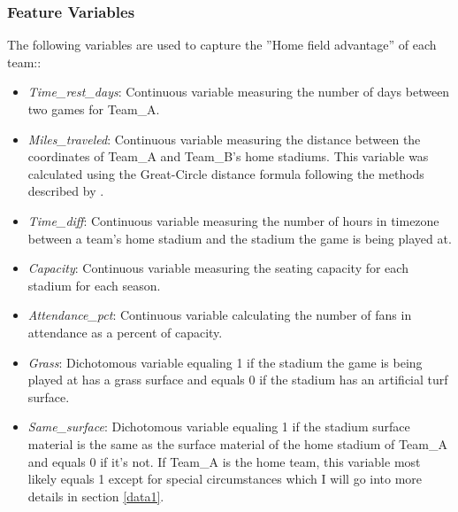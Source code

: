 \documentclass[12pt, letterpaper, twoside]{article}
\begin{document}
\subsubsection{Feature Variables}
The following variables are used to capture the ''Home field advantage'' of each team::
\begin{itemize}[noitemsep, leftmargin=*]
	
	\item \textit{Time\_rest\_days}: Continuous variable measuring the number of days between two games for Team\_A.
	
	\item \textit{Miles\_traveled}: Continuous variable measuring the distance between the coordinates of Team\_A and Team\_B's home stadiums. This variable was calculated using the Great-Circle distance formula following the methods described by \cite{distance}.
	
	\item \textit{Time\_diff}: Continuous variable measuring the number of hours in timezone between a team's home stadium and the stadium the game is being played at. 
	
	\item \textit{Capacity}: Continuous variable measuring the seating capacity for each stadium for each season.
		
	\item \textit{Attendance\_pct}: Continuous variable calculating the number of fans in attendance as a percent of capacity.
	
	\item \textit{Grass}: Dichotomous variable equaling 1 if the stadium the game is being played at has a grass surface and equals 0 if the stadium has an artificial turf surface.
	
	\item \textit{Same\_surface}: Dichotomous variable equaling 1 if the stadium surface material is the same as the surface material of the home stadium of Team\_A and equals 0 if it's not. If Team\_A is the home team, this variable most likely equals 1 except for special circumstances which I will go into more details in section \ref{data1}.
 
	
\end{itemize}
\end{document}
